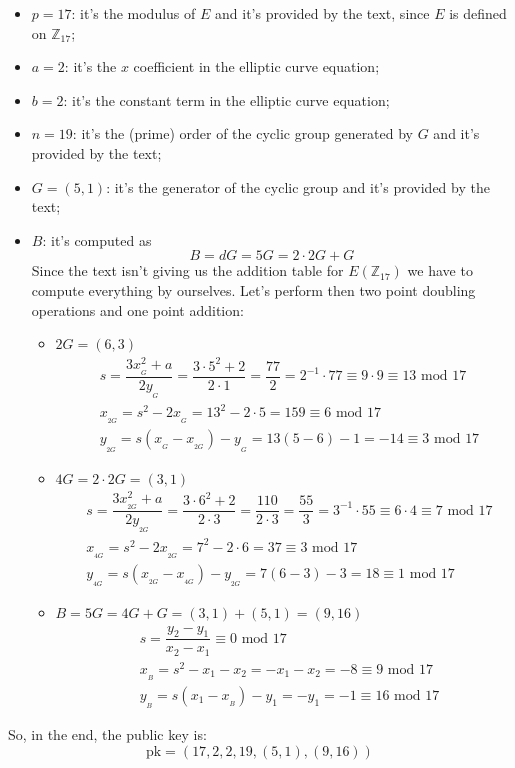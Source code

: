 \documentclass[11pt, a4paper]{article}
\newcommand{\mymod}{
    \text{ mod }
}
\begin{document}
\begin{itemize}
    \item $p=17$: it's the modulus of $E$ and it's provided by the text, since $E$ is defined on $\mathbb{Z}_{17}$;
    \item $a=2$: it's the $x$ coefficient in the elliptic curve equation;
    \item $b=2$: it's the constant term in the elliptic curve equation;
    \item $n=19$: it's the (prime) order of the cyclic group generated by $G$ and it's provided by the text;
    \item $G=(5,1)$: it's the generator of the cyclic group and it's provided by the text;
    \item $B$: it's computed as
    $$B=dG=5G=2\cdot2G+G$$
    Since the text isn't giving us the addition table for $E(\mathbb{Z}_{17})$ we have to compute everything by ourselves. Let's perform then two point doubling operations and one point addition:
    \begin{itemize}
        \item $2G=(6,3)$
        \begin{align*}
            &s=\dfrac{3x_{_G}^2+a}{2y_{_G}}=\dfrac{3\cdot5^2+2}{2\cdot1}=\dfrac{77}{2}=2^{-1}\cdot 77\equiv 9\cdot9\equiv13\mymod17\\
            &x_{_{2G}}=s^2-2x_{_G}=13^2-2\cdot5=159\equiv6\mymod17\\
            &y_{_{2G}}=s(x_{_G}-x_{_{2G}})-y_{_{G}}=13(5-6)-1=-14\equiv3\mymod17
        \end{align*}
        \item $4G=2\cdot2G=(3,1)$
        \begin{align*}
            &s=\dfrac{3x_{_{2G}}^2+a}{2y_{_{2G}}}=\dfrac{3\cdot6^2+2}{2\cdot3}=\dfrac{110}{2\cdot3}=\dfrac{55}{3}=3^{-1}\cdot55\equiv6\cdot4\equiv7\mymod17\\
            &x_{_{4G}}=s^2-2x_{_{2G}}=7^2-2\cdot6=37\equiv3\mymod17\\
            &y_{_{4G}}=s(x_{_{2G}}-x_{_{4G}})-y_{_{2G}}=7(6-3)-3=18\equiv1\mymod17
        \end{align*}
        \item $B=5G=4G+G=(3,1)+(5,1)=(9,16)$
        \begin{align*}
            &s=\dfrac{y_2-y_1}{x_2-x_1}\equiv0\mymod17\\
            &x_{_B}=s^2-x_1-x_2=-x_1-x_2=-8\equiv9\mymod17\\
            &y_{_B}=s(x_1-x_{_B})-y_1=-y_1=-1\equiv16\mymod17
        \end{align*}
    \end{itemize}
\end{itemize}
So, in the end, the public key is:
$$\text{pk}=(17,2,2,19,(5,1),(9,16))$$
\end{document}
